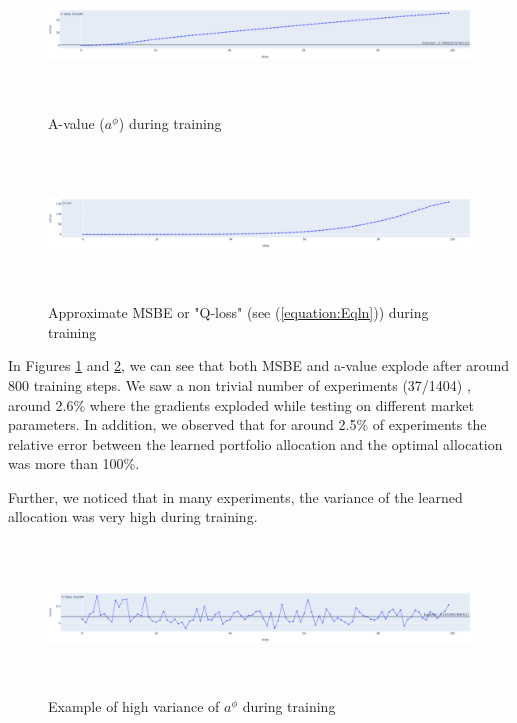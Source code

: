 \begin{figure}[htpb]
\centering
  \includegraphics[width=1\textwidth,height=4cm]{figures/DDPGExplod.png}
  \caption[A value Exploding Simulations -DDPG Functions]{A-value ($a^\phi$) during training } \label{fig:expa}
\end{figure}
\begin{figure}[htpb]
\centering
  \includegraphics[width=1\textwidth,height=4cm]{figures/DDPGExplodQLoss.png}
  \caption[Q loss Exploding Simulations -DDPG Functions]{Approximate MSBE or "Q-loss" (see (\ref{equation:Eqln}))    during training } \label{fig:expqloss}
\end{figure}

    In Figures \ref{fig:expa} and  \ref{fig:expqloss}, we can see that both MSBE and a-value explode after around 800 training steps.  We saw a non trivial number of experiments (37/1404) , around 2.6\% where the gradients exploded while testing on different market parameters. In addition, we observed that for around 2.5\% of experiments the relative error between the learned portfolio allocation and the optimal allocation was more than 100\%. 


Further, we noticed that in many experiments, the variance of the learned allocation was very high during training.

\begin{figure}[htpb]
  \includegraphics[width=1.0\textwidth,height=4cm]{figures/variance_ddpg.png}
  \caption[Variance of A value]{Example of high variance of $a^\phi$ during training} \label{fig:variance-ddpg}
\end{figure}

